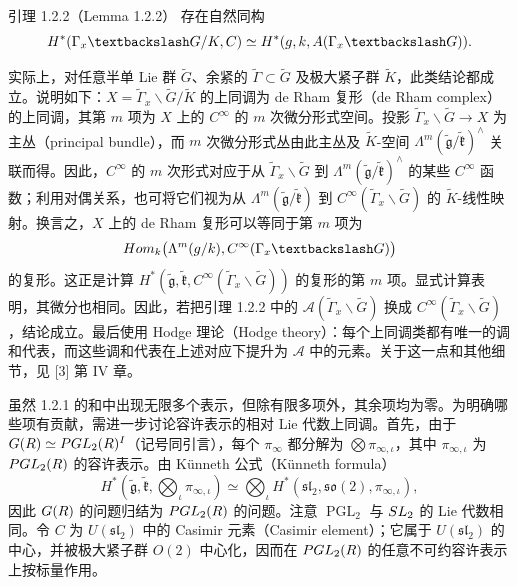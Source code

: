 \begin{originaltheorem}{引理 1.2.2（Lemma 1.2.2）}
存在自然同构
\[
 H^*(\widetilde\Gamma_x\backslash\widetilde G/\widetilde K,\C)
 \simeq H^*(\widetilde{\mathfrak g},\widetilde{\mathfrak k},
 \mathcal A(\widetilde\Gamma_x\backslash\widetilde G)).
\]
\end{originaltheorem}

实际上，对任意半单 Lie 群 $\widetilde G$、余紧的 $\widetilde\Gamma\subset\widetilde G$ 及极大紧子群 $\widetilde K$，此类结论都成立。说明如下：$X=\widetilde\Gamma_x\backslash\widetilde G/\widetilde K$ 的上同调为 de Rham 复形（de Rham complex）的上同调，其第 $m$ 项为 $X$ 上的 $C^\infty$ 的 $m$ 次微分形式空间。投影 $\widetilde\Gamma_x\backslash\widetilde G\to X$ 为主丛（principal bundle），而 $m$ 次微分形式丛由此主丛及 $\widetilde K$-空间 $\Lambda^m(\widetilde{\mathfrak g}/\widetilde{\mathfrak k})^\wedge$ 关联而得。因此，$C^\infty$ 的 $m$ 次形式对应于从 $\widetilde\Gamma_x\backslash\widetilde G$ 到 $\Lambda^m(\widetilde{\mathfrak g}/\widetilde{\mathfrak k})^\wedge$ 的某些 $C^\infty$ 函数；利用对偶关系，也可将它们视为从 $\Lambda^m(\widetilde{\mathfrak g}/\widetilde{\mathfrak k})$ 到 $C^\infty(\widetilde\Gamma_x\backslash\widetilde G)$ 的 $\widetilde K$-线性映射。换言之，$X$ 上的 de Rham 复形可以等同于第 $m$ 项为
\[
 \Hom_{\widetilde{\mathfrak k}}
 \bigl(\Lambda^m(\widetilde{\mathfrak g}/\widetilde{\mathfrak k}),
 C^\infty(\widetilde\Gamma_x\backslash\widetilde G)\bigr)
\]
的复形。这正是计算 $H^*(\widetilde{\mathfrak g},\widetilde{\mathfrak k},C^\infty(\widetilde\Gamma_x\backslash\widetilde G))$ 的复形的第 $m$ 项。显式计算表明，其微分也相同。因此，若把引理 1.2.2 中的 $\mathcal A(\widetilde\Gamma_x\backslash\widetilde G)$ 换成 $C^\infty(\widetilde\Gamma_x\backslash\widetilde G)$，结论成立。最后使用 Hodge 理论（Hodge theory）：每个上同调类都有唯一的调和代表，而这些调和代表在上述对应下提升为 $\mathcal A$ 中的元素。关于这一点和其他细节，见 [3] 第 IV 章。

虽然 1.2.1 的和中出现无限多个表示，但除有限多项外，其余项均为零。为明确哪些项有贡献，需进一步讨论容许表示的相对 Lie 代数上同调。首先，由于 $G(R)\simeq PGL_2(R)^I$（记号同引言），每个 $\pi_\infty$ 都分解为 $\bigotimes\pi_{\infty,\iota}$，其中 $\pi_{\infty,\iota}$ 为 $PGL_2(R)$ 的容许表示。由 Künneth 公式（Künneth formula）
\[
 H^*(\widetilde{\mathfrak g},\widetilde{\mathfrak k},
 \bigotimes_\iota\pi_{\infty,\iota})
 \simeq\bigotimes_\iota H^*(\mathfrak{sl}_2,\mathfrak{so}(2),\pi_{\infty,\iota}),
\]
因此 $G(R)$ 的问题归结为 $PGL_2(R)$ 的问题。注意 $\operatorname{PGL}_2$ 与 $SL_2$ 的 Lie 代数相同。令 $C$ 为 $U(\mathfrak{sl}_2)$ 中的 Casimir 元素（Casimir element）；它属于 $U(\mathfrak{sl}_2)$ 的中心，并被极大紧子群 $O(2)$ 中心化，因而在 $PGL_2(R)$ 的任意不可约容许表示上按标量作用。

